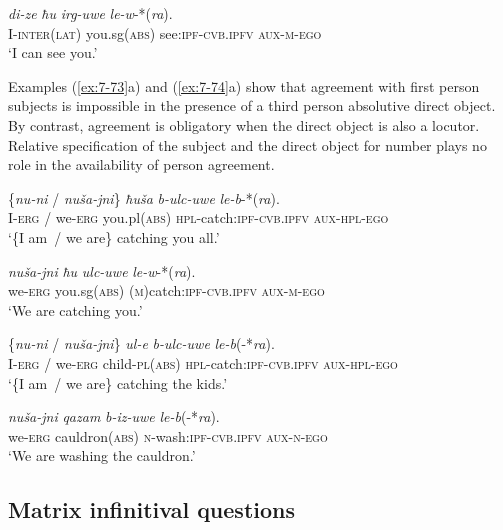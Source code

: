 ﻿\documentclass[output=paper]{langsci/langscibook}
\begin{document}
\ex %
\gll \emph{di-ze} \emph{ħu} \emph{irg-uwe} \emph{le-w}-*(\emph{ra}).\\
I-\textsc{inter(lat)} you.sg(\textsc{abs}) see:\textsc{ipf}-\textsc{cvb.ipfv} \textsc{aux}-\textsc{m}-\textsc{ego}\\
\glt `I can see you.'
\z
\z

Examples (\ref{ex:7-73}a) and (\ref{ex:7-74}a) show that agreement with first person subjects
is impossible in the presence of a third person absolutive direct
object. By contrast, agreement is obligatory when the direct object is
also a locutor. Relative specification of the subject and the direct
object for number plays no role in the availability of person agreement.

\ea %
\ea %
\gll \{\emph{nu-ni} / \emph{nuša-jni}\} \emph{ħuša} \emph{b-ulc-uwe} \emph{le-b}-*(\emph{ra}).\\
I-\textsc{erg} / we-\textsc{erg} you.pl(\textsc{abs)} \textsc{hpl}-catch:\textsc{ipf}-\textsc{cvb.ipfv} \textsc{aux}-\textsc{hpl}-\textsc{ego}\\
\glt `\{I am~/ we are\} catching you all.'

\ex %
\gll \emph{nuša-jni} \emph{ħu} \emph{ulc-uwe} \emph{le-w}-*(\emph{ra}).\\
we-\textsc{erg} you.sg(\textsc{abs)} (\textsc{m})catch:\textsc{ipf}-\textsc{cvb.ipfv} \textsc{aux}-\textsc{m}-\textsc{ego}\\
\glt `We are catching you.'
\z

\ex %
\ea %
\gll \{\emph{nu-ni} / \emph{nuša-jni}\} \emph{ul-e} \emph{b-ulc-uwe} \emph{le-b}(-*\emph{ra}).\\
I-\textsc{erg} / we-\textsc{erg} child-\textsc{pl}(\textsc{abs}) \textsc{hpl}-catch:\textsc{ipf}-\textsc{cvb.ipfv} \textsc{aux}-\textsc{hpl}-\textsc{ego}\\
\glt `\{I am~/ we are\} catching the kids.'

\ex %
\gll \emph{nuša-jni} \emph{qazam} \emph{b-iz-uwe} \emph{le-b}(-*\emph{ra}).\\
we-\textsc{erg} cauldron(\textsc{abs)} \textsc{n}-wash:\textsc{ipf}-\textsc{cvb.ipfv} \textsc{aux}-\textsc{n}-\textsc{ego}\\
\glt `We are washing the cauldron.'
\z
\z

\subsection{Matrix infinitival questions}\label{matrix-infinitival-questions}
\end{document}
